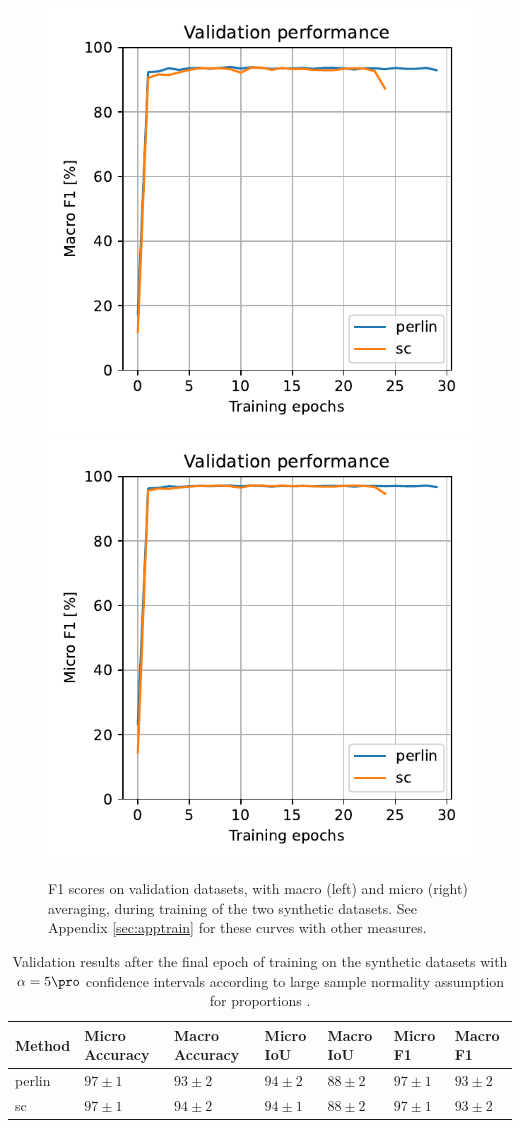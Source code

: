 \documentclass[12pt,fleqn]{article}
\begin{document}
\begin{figure}[H]
    \centering
        \includegraphics[width=.49\linewidth]{fb/Macro F1}
        \includegraphics[width=.49\linewidth]{fb/Micro F1}
    \caption{
        F1 scores on validation datasets, with macro (left) and micro (right) averaging, during training of the two synthetic datasets. See Appendix \ref{sec:apptrain} for these curves with other measures.
    }
    \label{fig:fbcurves}
\end{figure}\noindent


\begin{table}[H]
    \small
    \centering
    \begin{tabular}{l|llllll}
            Method & Micro Accuracy & Macro Accuracy & Micro IoU & Macro IoU & Micro F1 & Macro F1 \\
            \hline
            perlin & $97 \pm 1$ & $93 \pm 2$ & $94 \pm 2$ & $88 \pm 2$ & $97 \pm 1$ & $93 \pm 2$ \\
            sc & $97 \pm 1$ & $94 \pm 2$ & $94 \pm 1$ & $88 \pm 2$ & $97 \pm 1$ & $93 \pm 2$ \\
    \end{tabular}
    \caption{
        Validation results after the final epoch of training on the synthetic datasets with $\alpha=5\pro$ confidence intervals according to large sample normality assumption for proportions \cite[Method 7.3]{brock2015intro}.
    }
    \label{tab:fbfinal}
\end{table}\noindent
\end{document}

